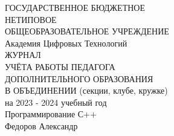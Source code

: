 \documentclass{article}
\begin{document}
\thispagestyle{empty}
\begin{center}
 {\huge ГОСУДАРСТВЕННОЕ БЮДЖЕТНОЕ }
  \\
\vspace{5mm} %
 {\huge НЕТИПОВОЕ }
  \\
\vspace{5mm} %
 {\huge ОБЩЕОБРАЗОВАТЕЛЬНОЕ УЧРЕЖДЕНИЕ }
 \\
\vspace{5mm} %
{\huge  
Академия Цифровых Технологий
 }
 \\
\vspace{50mm} %
{\huge  ЖУРНАЛ }
\\
\vspace{30mm} %
{\huge УЧЁТА РАБОТЫ ПЕДАГОГА }
\\
\vspace{2mm} %
{\huge ДОПОЛНИТЕЛЬНОГО ОБРАЗОВАНИЯ }
\\
\vspace{2mm} %
{\huge  В ОБЪЕДИНЕНИИ (секции, клубе, кружке) }
\\
\vspace{2mm} %
{\huge  на 2023 - 2024 учебный год }
\\
\vspace{50mm} %
{\huge 
Программирование С++
 }
\\
\vspace{2mm} %
{\huge 
Федоров Александр
 }
\end{center}
\clearpage
\restoregeometry

\clearpage

\clearpage
\end{document}
